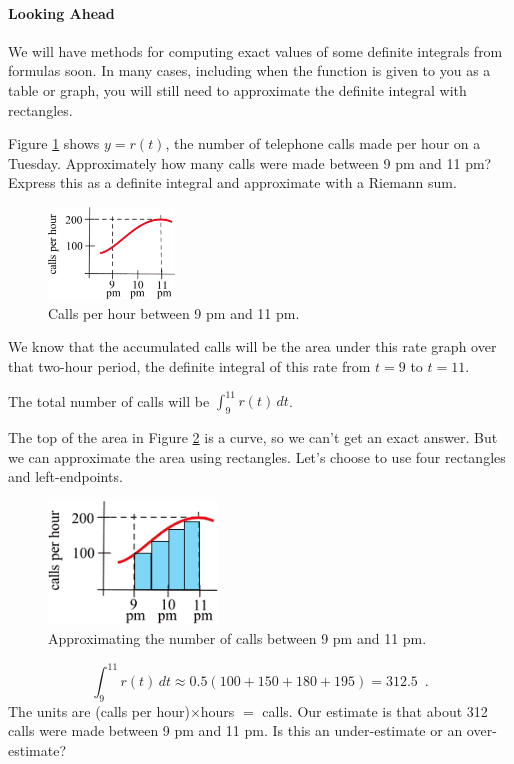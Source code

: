 \begin{definition}
\paragraph{Looking Ahead}
We will have methods for computing exact values of some definite integrals from formulas soon. In many cases, including when the function is given to you as a table or graph, you will still need to approximate the definite integral with rectangles.
\end{definition}
\begin{example}
Figure \ref{fig:5-3-calls} shows $y=r(t)$, the number of telephone calls made per hour on a Tuesday. Approximately how many calls were made between 9 pm and 11 pm? Express this as a definite integral and approximate with a Riemann sum.

\begin{figure}[!ht]
  \centering
    \includegraphics[width=0.3\textwidth]{img/chap5/image010.png}
    \caption{Calls per hour between 9 pm and 11 pm.}
    \label{fig:5-3-calls}
\end{figure}

\begin{solution}
We know that the accumulated calls will be the area under this rate graph over that two-hour period, the definite integral of this rate from $t=9$ to $t=11$.

The total number of calls will be $\displaystyle\int_9^{11}r(t)\,dt$.

The top of the area in Figure \ref{fig:5-3-callsapprox} is a curve, so we can’t get an exact answer. But we can approximate the area using rectangles. Let's choose to use four rectangles and left-endpoints.

\begin{figure}[!ht]
  \centering
    \includegraphics[width=0.4\textwidth]{img/chap5/image066.png}
    \caption{Approximating the number of calls between 9 pm and 11 pm.}
    \label{fig:5-3-callsapprox}
\end{figure}
$$\int_9^{11}r(t)\,dt\approx   0.5(100+150+180+195)=312.5 \enspace .$$
The units are (calls per hour)$\times$hours $=$ calls. Our estimate is that about 312 calls were made between 9 pm and 11 pm. Is this an under-estimate or an over-estimate?
\end{solution}\end{example}

